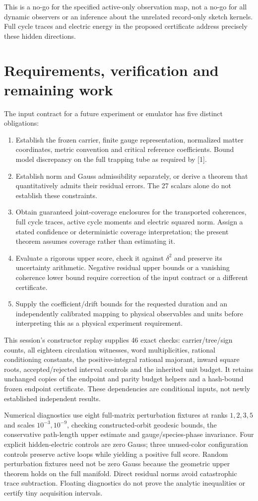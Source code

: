 \documentclass[11pt,a4paper]{article}
\begin{document}
This is a no-go for the specified active-only observation map, not a no-go for all dynamic observers or an inference about the unrelated record-only sketch kernels. Full cycle traces and electric energy in the proposed certificate address precisely these hidden directions.
\newpage
\section{Requirements, verification and remaining work}
The input contract for a future experiment or emulator has five distinct obligations:
\begin{enumerate}
\item Establish the frozen carrier, finite gauge representation, normalized matter coordinates, metric convention and critical reference coefficients. Bound model discrepancy on the full trapping tube as required by [1].
\item Establish norm and Gauss admissibility separately, or derive a theorem that quantitatively admits their residual errors. The 27 scalars alone do not establish these constraints.
\item Obtain guaranteed joint-coverage enclosures for the transported coherences, full cycle traces, active cycle moments and electric squared norm. Assign a stated confidence or deterministic coverage interpretation; the present theorem assumes coverage rather than estimating it.
\item Evaluate a rigorous upper score, check it against $\delta^2$ and preserve its uncertainty arithmetic. Negative residual upper bounds or a vanishing coherence lower bound require correction of the input contract or a different certificate.
\item Supply the coefficient/drift bounds for the requested duration and an independently calibrated mapping to physical observables and units before interpreting this as a physical experiment requirement.
\end{enumerate}
This session's constructor replay supplies 46 exact checks: carrier/tree/sign counts, all eighteen circulation witnesses, word multiplicities, rational conditioning constants, the positive-integral rational majorant, inward square roots, accepted/rejected interval controls and the inherited unit budget. It retains unchanged copies of the endpoint and parity budget helpers and a hash-bound frozen endpoint certificate. These dependencies are conditional inputs, not newly established independent results.

Numerical diagnostics use eight full-matrix perturbation fixtures at ranks $1,2,3,5$ and scales $10^{-3},10^{-9}$, checking constructed-orbit geodesic bounds, the conservative path-length upper estimate and gauge/species-phase invariance. Four explicit hidden-electric controls are zero Gauss; three unused-color configuration controls preserve active loops while yielding a positive full score. Random perturbation fixtures need not be zero Gauss because the geometric upper theorem holds on the full manifold. Direct residual norms avoid catastrophic trace subtraction. Floating diagnostics do not prove the analytic inequalities or certify tiny acquisition intervals.
\end{document}
